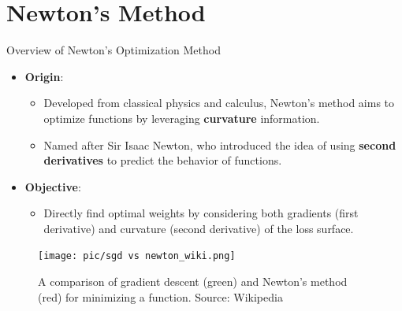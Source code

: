 \documentclass[serif, aspectratio=169]{beamer}
\begin{document}
\section{Newton's Method}
\begin{frame}{Overview of Newton's Optimization Method}
\begin{minipage}{0.65\linewidth}
    \begin{itemize}
        \item \textbf{Origin}: 
        \begin{itemize}
            \item Developed from classical physics and calculus, Newton's method aims to optimize functions by leveraging \textbf{curvature} information.
            \item Named after Sir Isaac Newton, who introduced the idea of using \textbf{second derivatives} to predict the behavior of functions.
        \end{itemize}
        
        \item \textbf{Objective}:
        \begin{itemize}
            \item Directly find optimal weights by considering both gradients (first derivative) and curvature (second derivative) of the loss surface.
        \end{itemize}
    \end{itemize}
\end{minipage}%
\begin{minipage}{0.25\linewidth}
    \begin{figure}
        \centering
        \texttt{[image: pic/sgd vs newton\_wiki.png]}
        \caption{A comparison of gradient descent (green) and Newton's method (red) for minimizing a function. Source: Wikipedia}
    \end{figure}
\end{minipage}
\end{frame}
\end{document}

